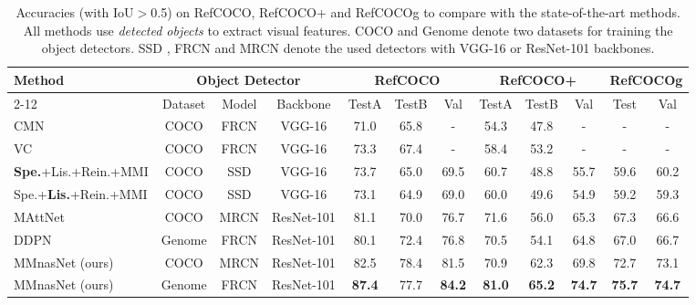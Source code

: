 \documentclass[sigconf]{acmart}
\begin{document}
\setcounter{table}{4}
\begin{table*}
\centering
\small
\caption{Accuracies (with IoU$>$0.5) on RefCOCO, RefCOCO+ and RefCOCOg to compare with the state-of-the-art methods. All methods use \emph{detected objects} to extract visual features. COCO \cite{lin2014microsoft} and Genome \cite{krishna2017visual} denote two datasets for training the object detectors. SSD \cite{liu2016ssd}, FRCN \cite{ren2015faster} and MRCN \cite{he2017mask} denote the used detectors with VGG-16 \cite{simonyan2014very} or ResNet-101 \cite{he2015deep} backbones.
}\label{table:refcoco}
\begin{tabular}{l|ccc|ccc|ccc|cc}
\toprule
\multirow{3}{*}{Method} &\multicolumn{3}{c|}{Object Detector}& \multicolumn{3}{c|}{RefCOCO} & \multicolumn{3}{c}{RefCOCO+} & \multicolumn{2}{|c}{RefCOCOg}\\
\cmidrule{2-12}
&Dataset&Model&Backbone&  TestA & TestB & Val & TestA & TestB & Val & Test & Val \\
\midrule
CMN \cite{hu2017modeling} &COCO& FRCN &VGG-16 & 71.0 & 65.8 & - & 54.3 & 47.8 & - & - & -\\
VC \cite{zhang2018grounding} &COCO& FRCN &VGG-16 & 73.3 & 67.4 & - & 58.4 & 53.2 & - & - & -\\
\textbf{Spe.}+Lis.+Rein.+MMI \cite{yu2017joint} &COCO& SSD &VGG-16 & 73.7 & 65.0 & 69.5 & 60.7 & 48.8 & 55.7 & 59.6 & 60.2\\
Spe.+\textbf{Lis.}+Rein.+MMI \cite{yu2017joint} &COCO& SSD &VGG-16 & 73.1 & 64.9 & 69.0 & 60.0 & 49.6 & 54.9 & 59.2 & 59.3\\
MAttNet \cite{yu2018mattnet} &COCO& MRCN &ResNet-101 & 81.1 & 70.0 & 76.7 & 71.6 & 56.0 & 65.3 & 67.3 & 66.6 \\
DDPN \cite{yu2018rethinking} &Genome& FRCN &ResNet-101 & 80.1 & 72.4 & 76.8 & 70.5 & 54.1 & 64.8 & 67.0 & 66.7 \\
\midrule
MMnasNet (ours) & COCO & MRCN &ResNet-101 & 82.5 & 78.4 & 81.5 & 70.9 & 62.3 & 69.8 & 72.7 & 73.1\\
MMnasNet (ours) & Genome & FRCN &ResNet-101 & \textbf{87.4} & {77.7} & \textbf{84.2} & \textbf{81.0} & \textbf{65.2} & \textbf{74.7} & \textbf{75.7} & \textbf{74.7} \\
\bottomrule
\end{tabular}
\end{table*}
\end{document}
